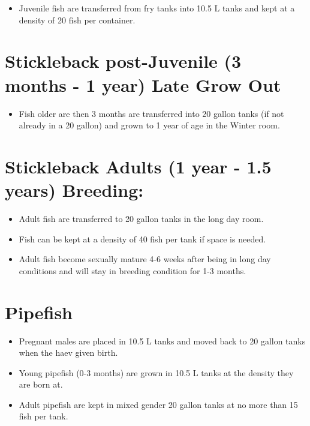 \documentclass[
  letterpaper,
  DIV=11,
  numbers=noendperiod]{scrreprt}
\providecommand{\tightlist}{%
  \setlength{\itemsep}{0pt}\setlength{\parskip}{0pt}}\usepackage{longtable,booktabs,array}
\begin{document}
\begin{itemize}
\tightlist
\item
  Juvenile fish are transferred from fry tanks into 10.5 L tanks and
  kept at a density of 20 fish per container.
\end{itemize}

\hypertarget{stickleback-post-juvenile-3-months---1-year-late-grow-out}{%
\section{Stickleback post-Juvenile (3 months - 1 year) Late Grow
Out}\label{stickleback-post-juvenile-3-months---1-year-late-grow-out}}

\begin{itemize}
\tightlist
\item
  Fish older are then 3 months are transferred into 20 gallon tanks (if
  not already in a 20 gallon) and grown to 1 year of age in the Winter
  room.
\end{itemize}

\hypertarget{stickleback-adults-1-year---1.5-years-breeding}{%
\section{Stickleback Adults (1 year - 1.5 years)
Breeding:}\label{stickleback-adults-1-year---1.5-years-breeding}}

\begin{itemize}
\tightlist
\item
  Adult fish are transferred to 20 gallon tanks in the long day room.
\item
  Fish can be kept at a density of 40 fish per tank if space is needed.
\item
  Adult fish become sexually mature 4-6 weeks after being in long day
  conditions and will stay in breeding condition for 1-3 months.
\end{itemize}

\hypertarget{pipefish}{%
\section{Pipefish}\label{pipefish}}

\begin{itemize}
\tightlist
\item
  Pregnant males are placed in 10.5 L tanks and moved back to 20 gallon
  tanks when the haev given birth.
\item
  Young pipefish (0-3 months) are grown in 10.5 L tanks at the density
  they are born at.
\item
  Adult pipefish are kept in mixed gender 20 gallon tanks at no more
  than 15 fish per tank.
\end{itemize}
\end{document}
